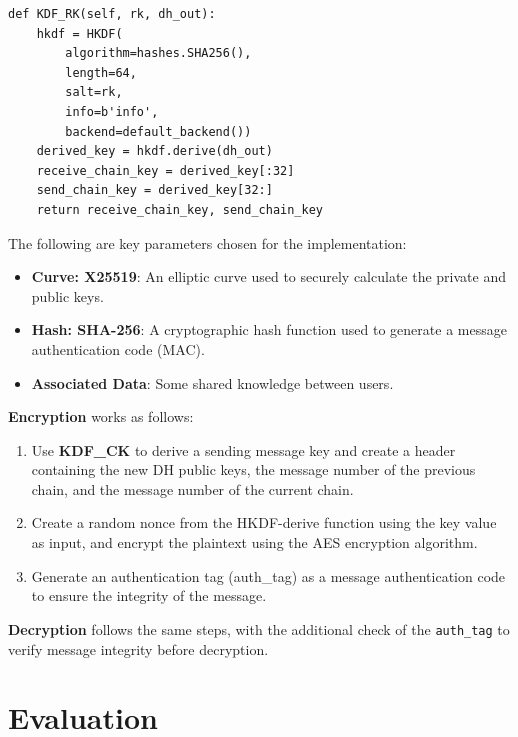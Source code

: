 \documentclass[11pt]{article}
\begin{document}
\begin{lstlisting}[caption={Sample Implementation of Key Functions}, label={code:code_double_ratchet}]
def KDF_RK(self, rk, dh_out):
    hkdf = HKDF(
        algorithm=hashes.SHA256(),
        length=64,
        salt=rk,
        info=b'info',
        backend=default_backend())
    derived_key = hkdf.derive(dh_out)
    receive_chain_key = derived_key[:32]
    send_chain_key = derived_key[32:]
    return receive_chain_key, send_chain_key
\end{lstlisting}


The following are key parameters chosen for the implementation:

\begin{itemize}
    \item \textbf{Curve: X25519}: An elliptic curve used to securely calculate the private and public keys.
    \item \textbf{Hash: SHA-256}: A cryptographic hash function used to generate a message authentication code (MAC).
    \item \textbf{Associated Data}: Some shared knowledge between users.
\end{itemize}

\textbf{Encryption} works as follows:
\begin{enumerate}
    \item Use \textbf{KDF\_CK} to derive a sending message key and create a header containing the new DH public keys, the message number of the previous chain, and the message number of the current chain.
    \item Create a random nonce from the HKDF-derive function using the key value as input, and encrypt the plaintext using the AES encryption algorithm.
    \item Generate an authentication tag (auth\_tag) as a message authentication code to ensure the integrity of the message.
\end{enumerate}

\textbf{Decryption} follows the same steps, with the additional check of the \texttt{auth\_tag} to verify message integrity before decryption.


\section{Evaluation}\label{eval}
\end{document}
